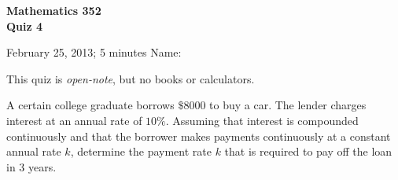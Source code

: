 \documentclass[11pt]{exam}
\begin{document}
\noindent
\textbf{{\large Mathematics 352 \\ Quiz 4}}

\noindent
February 25, 2013; 5 minutes  \hfill Name: \underline{\hspace{3in}} 

\noindent
This quiz is \emph{open-note}, but no books or calculators.

\begin{questions}  



\question A certain college graduate borrows $\$8000$ to buy a car. The lender charges interest at an annual rate of $10\%$. Assuming that interest is compounded continuously and that the borrower makes payments continuously at a constant annual rate $k$, determine the payment rate $k$ that is required to pay off the loan in $3$ years. 


\end{questions}
\end{document}
